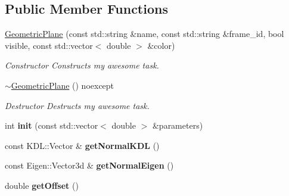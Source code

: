 \subsection*{Public Member Functions}
\begin{DoxyCompactItemize}
\item 
\hypertarget{classhiqp_1_1GeometricPlane_ae692d998a74c9748d4803c118b1c3cee}{\hyperlink{classhiqp_1_1GeometricPlane_ae692d998a74c9748d4803c118b1c3cee}{Geometric\-Plane} (const std\-::string \&name, const std\-::string \&frame\-\_\-id, bool visible, const std\-::vector$<$ double $>$ \&color)}\label{classhiqp_1_1GeometricPlane_ae692d998a74c9748d4803c118b1c3cee}

\begin{DoxyCompactList}\small\item\em Constructor Constructs my awesome task. \end{DoxyCompactList}\item 
\hypertarget{classhiqp_1_1GeometricPlane_af14836e138c3207696c8cf0cdb93f571}{\hyperlink{classhiqp_1_1GeometricPlane_af14836e138c3207696c8cf0cdb93f571}{$\sim$\-Geometric\-Plane} () noexcept}\label{classhiqp_1_1GeometricPlane_af14836e138c3207696c8cf0cdb93f571}

\begin{DoxyCompactList}\small\item\em Destructor Destructs my awesome task. \end{DoxyCompactList}\item 
\hypertarget{classhiqp_1_1GeometricPlane_a5e2c29769399350b1aed5aaecc9f9c40}{int {\bfseries init} (const std\-::vector$<$ double $>$ \&parameters)}\label{classhiqp_1_1GeometricPlane_a5e2c29769399350b1aed5aaecc9f9c40}

\item 
\hypertarget{classhiqp_1_1GeometricPlane_a5b1badbc21d2ad597c9c9e3df0227d6e}{const K\-D\-L\-::\-Vector \& {\bfseries get\-Normal\-K\-D\-L} ()}\label{classhiqp_1_1GeometricPlane_a5b1badbc21d2ad597c9c9e3df0227d6e}

\item 
\hypertarget{classhiqp_1_1GeometricPlane_a5b4bd08552dea15474f9f46f7fbd69b3}{const Eigen\-::\-Vector3d \& {\bfseries get\-Normal\-Eigen} ()}\label{classhiqp_1_1GeometricPlane_a5b4bd08552dea15474f9f46f7fbd69b3}

\item 
\hypertarget{classhiqp_1_1GeometricPlane_a1495ac22718314657c4b9444adcb5faa}{double {\bfseries get\-Offset} ()}\label{classhiqp_1_1GeometricPlane_a1495ac22718314657c4b9444adcb5faa}


\end{DoxyCompactItemize}
